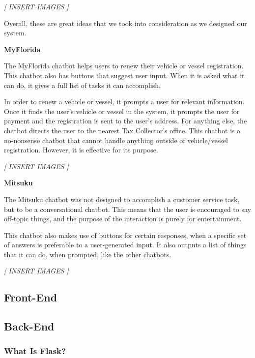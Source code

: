 \documentclass[titlepage, 12pt]{article}
\begin{document}
\begin{center}\emph{[ INSERT IMAGES ]}\end{center}

Overall, these are great ideas that we took into consideration as we designed our system.

\textbf{MyFlorida}

The MyFlorida chatbot helps users to renew their vehicle or vessel registration. This chatbot also has buttons that suggest user input. When it is asked what it can do, it gives a full list of tasks it can accomplish.

In order to renew a vehicle or vessel, it prompts a user for relevant information. Once it finds the user’s vehicle or vessel in the system, it prompts the user for payment and the registration is sent to the user’s address. For anything else, the chatbot directs the user to the nearest Tax Collector’s office. This chatbot is a no-nonsense chatbot that cannot handle anything outside of vehicle/vessel registration. However, it is effective for its purpose.

\begin{center}\emph{[ INSERT IMAGES ]}\end{center}

\textbf{Mitsuku}

The Mitsuku chatbot was not designed to accomplish a customer service task, but to be a conversational chatbot. This means that the user is encouraged to say off-topic things, and the purpose of the interaction is purely for entertainment. 
 
This chatbot also makes use of buttons for certain responses, when a specific set of answers is preferable to a user-generated input. It also outputs a list of things that it can do, when prompted, like the other chatbots.

\begin{center}\emph{[ INSERT IMAGES ]}\end{center}



\subsection{Front-End}

\subsection{Back-End}

\subsubsection{What Is Flask?}
\end{document}
